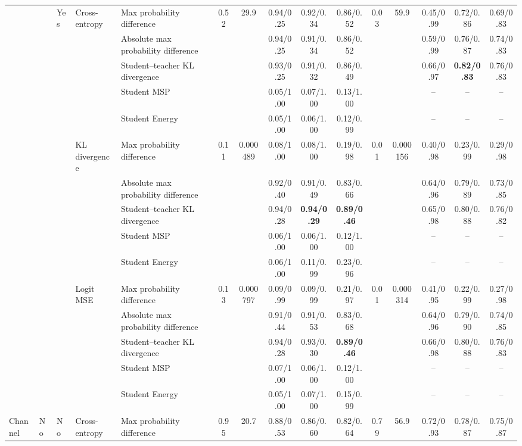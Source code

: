 \documentclass[border=2pt]{standalone}
\begin{document}
\begin{tabular}{lllllcccccccccc}
 &  & Yes & Cross-entropy & Max probability difference & 0.52 & 29.9 & 0.94/0.25 & 0.92/0.34 & 0.86/0.52 & 0.03 & 59.9 & 0.45/0.99 & 0.72/0.86 & 0.69/0.83 \\
 &  &  &  & Absolute max probability difference &  &  & 0.94/0.25 & 0.91/0.34 & 0.86/0.52 &  &  & 0.59/0.99 & 0.76/0.87 & 0.74/0.83 \\
 &  &  &  & Student--teacher KL divergence &  &  & 0.93/0.25 & 0.91/0.32 & 0.86/0.49 &  &  & 0.66/0.97 & \textbf{0.82/0.83} & 0.76/0.83 \\
 &  &  &  & Student MSP &  &  & 0.05/1.00 & 0.07/1.00 & 0.13/1.00 &  &  & -- & -- & -- \\
 &  &  &  & Student Energy &  &  & 0.05/1.00 & 0.06/1.00 & 0.12/0.99 &  &  & -- & -- & -- \\
 &  &  & KL divergence & Max probability difference & 0.11 & 0.000489 & 0.08/1.00 & 0.08/1.00 & 0.19/0.98 & 0.01 & 0.000156 & 0.40/0.98 & 0.23/0.99 & 0.29/0.98 \\
 &  &  &  & Absolute max probability difference &  &  & 0.92/0.40 & 0.91/0.49 & 0.83/0.66 &  &  & 0.64/0.96 & 0.79/0.89 & 0.73/0.85 \\
 &  &  &  & Student--teacher KL divergence &  &  & 0.94/0.28 & \textbf{0.94/0.29} & \textbf{0.89/0.46} &  &  & 0.65/0.98 & 0.80/0.88 & 0.76/0.82 \\
 &  &  &  & Student MSP &  &  & 0.06/1.00 & 0.06/1.00 & 0.12/1.00 &  &  & -- & -- & -- \\
 &  &  &  & Student Energy &  &  & 0.06/1.00 & 0.11/0.99 & 0.23/0.96 &  &  & -- & -- & -- \\
 &  &  & Logit MSE & Max probability difference & 0.13 & 0.000797 & 0.09/0.99 & 0.09/0.99 & 0.21/0.97 & 0.01 & 0.000314 & 0.41/0.95 & 0.22/0.99 & 0.27/0.98 \\
 &  &  &  & Absolute max probability difference &  &  & 0.91/0.44 & 0.91/0.53 & 0.83/0.68 &  &  & 0.64/0.96 & 0.79/0.90 & 0.74/0.85 \\
 &  &  &  & Student--teacher KL divergence &  &  & 0.94/0.28 & 0.93/0.30 & \textbf{0.89/0.46} &  &  & 0.66/0.98 & 0.80/0.88 & 0.76/0.83 \\
 &  &  &  & Student MSP &  &  & 0.07/1.00 & 0.06/1.00 & 0.12/1.00 &  &  & -- & -- & -- \\
 &  &  &  & Student Energy &  &  & 0.05/1.00 & 0.07/1.00 & 0.15/0.99 &  &  & -- & -- & -- \\
\addlinespace
Channel & No & No & Cross-entropy & Max probability difference & 0.95 & 20.7 & 0.88/0.53 & 0.86/0.60 & 0.82/0.64 & 0.79 & 56.9 & 0.72/0.93 & 0.78/0.87 & 0.75/0.87 \\

\end{tabular}
\end{document}

